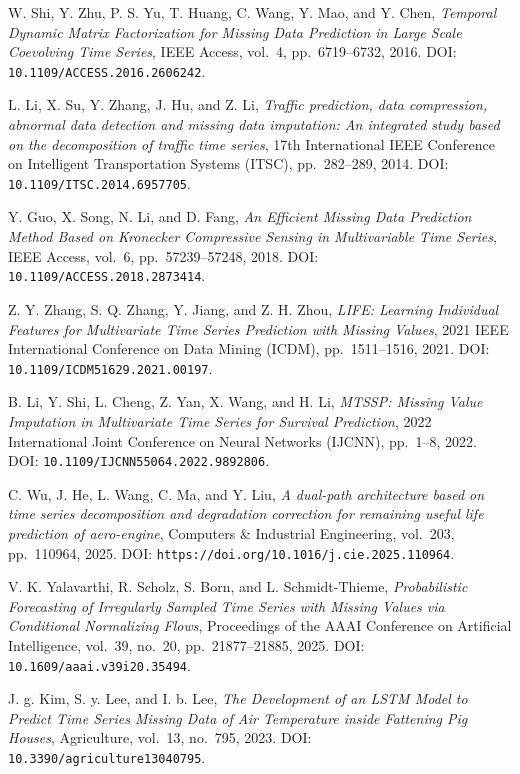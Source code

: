 \begin{enumerate}[label={[S\arabic*]}]
    \item %
    W. Shi, Y. Zhu, P. S. Yu, T. Huang, C. Wang, Y. Mao, and Y. Chen, \textit{Temporal Dynamic Matrix Factorization for Missing Data Prediction in Large Scale Coevolving Time Series}, IEEE Access, vol.~4, pp.~6719–6732, 2016. DOI: \texttt{10.1109/ACCESS.2016.2606242}.
    \item %
    L. Li, X. Su, Y. Zhang, J. Hu, and Z. Li, \textit{Traffic prediction, data compression, abnormal data detection and missing data imputation: An integrated study based on the decomposition of traffic time series}, 17th International IEEE Conference on Intelligent Transportation Systems (ITSC), pp.~282–289, 2014. DOI: \texttt{10.1109/ITSC.2014.6957705}.
    \item %
    Y. Guo, X. Song, N. Li, and D. Fang, \textit{An Efficient Missing Data Prediction Method Based on Kronecker Compressive Sensing in Multivariable Time Series}, IEEE Access, vol.~6, pp.~57239–57248, 2018. DOI: \texttt{10.1109/ACCESS.2018.2873414}.
    \item %
    Z. Y. Zhang, S. Q. Zhang, Y. Jiang, and Z. H. Zhou, \textit{LIFE: Learning Individual Features for Multivariate Time Series Prediction with Missing Values}, 2021 IEEE International Conference on Data Mining (ICDM), pp.~1511–1516, 2021. DOI: \texttt{10.1109/ICDM51629.2021.00197}.
    \item %
    B. Li, Y. Shi, L. Cheng, Z. Yan, X. Wang, and H. Li, \textit{MTSSP: Missing Value Imputation in Multivariate Time Series for Survival Prediction}, 2022 International Joint Conference on Neural Networks (IJCNN), pp.~1–8, 2022. DOI: \texttt{10.1109/IJCNN55064.2022.9892806}.
    \item %
    C. Wu, J. He, L. Wang, C. Ma, and Y. Liu, \textit{A dual-path architecture based on time series decomposition and degradation correction for remaining useful life prediction of aero-engine}, Computers \& Industrial Engineering, vol.~203, pp.~110964, 2025. DOI: \texttt{https://doi.org/10.1016/j.cie.2025.110964}.
    \item %
    V. K. Yalavarthi, R. Scholz, S. Born, and L. Schmidt-Thieme, \textit{Probabilistic Forecasting of Irregularly Sampled Time Series with Missing Values via Conditional Normalizing Flows}, Proceedings of the AAAI Conference on Artificial Intelligence, vol.~39, no.~20, pp.~21877–21885, 2025. DOI: \texttt{10.1609/aaai.v39i20.35494}.
    \item %
    J. g. Kim, S. y. Lee, and I. b. Lee, \textit{The Development of an LSTM Model to Predict Time Series Missing Data of Air Temperature inside Fattening Pig Houses}, Agriculture, vol.~13, no.~795, 2023. DOI: \texttt{10.3390/agriculture13040795}.

\end{enumerate}
